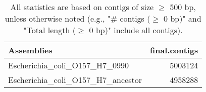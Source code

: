 \documentclass[12pt,a4paper]{article}
\begin{document}
\begin{table}[ht]
\begin{center}
\caption{All statistics are based on contigs of size $\geq$ 500 bp, unless otherwise noted (e.g., "\# contigs ($\geq$ 0 bp)" and "Total length ($\geq$ 0 bp)" include all contigs).}
\begin{tabular}{|l*{1}{|r}|}
\hline
Assemblies & final.contigs \\ \hline
Escherichia\_coli\_O157\_H7\_0990 & 5003124 \\ \hline
Escherichia\_coli\_O157\_H7\_ancestor & 4958288 \\ \hline
\end{tabular}
\end{center}
\end{table}
\end{document}
